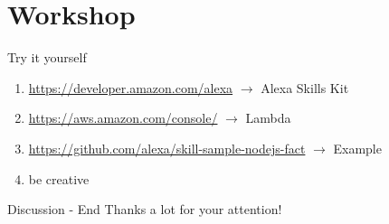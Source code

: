 \documentclass[aspectratio=169]{beamer}
\begin{document}
\section{Workshop}
\begin{frame}{Try it yourself}
\centering
\begin{enumerate}
	\item \url{https://developer.amazon.com/alexa} $\rightarrow$ Alexa Skills Kit
	
	\item \url{https://aws.amazon.com/console/} $\rightarrow$ Lambda
	
	\item \url{https://github.com/alexa/skill-sample-nodejs-fact} $\rightarrow$ Example
	
	\item be creative
	
\end{enumerate}
\end{frame}

\begin{frame}{Discussion - End}
	\centering
	\huge{Thanks a lot for your attention!}
\end{frame}
\end{document}
